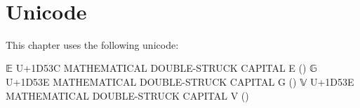 \begin{fence}
\begin{code}
\AgdaSymbol{=}\AgdaSpace{}%
%
\>[2135I]\AgdaSpace{}%
\AgdaSpace{}%
\AgdaSpace{}%
\AgdaSpace{}%
\AgdaSymbol{(}\AgdaSpace{}%
\AgdaSymbol{))}\AgdaSpace{}%
\AgdaOperator{\AgdaInductiveConstructor{,}}\<%
\\
\>[.][@{}l@{}]\<[2135I]%
\>[19]\AgdaSpace{}%
\AgdaSpace{}%
\AgdaSpace{}%
\AgdaSpace{}%
\AgdaSymbol{(}\AgdaSpace{}%
\AgdaSymbol{(}\AgdaSpace{}%
\AgdaSymbol{(}\AgdaSpace{}%
\AgdaSymbol{))))}\AgdaSpace{}%
\<%
\end{code}
\end{fence}

\hypertarget{unicode}{%
\section{Unicode}\label{unicode}}

This chapter uses the following unicode:

\begin{myDisplay}
𝔼  U+1D53C  MATHEMATICAL DOUBLE-STRUCK CAPITAL E (\bE)
𝔾  U+1D53E  MATHEMATICAL DOUBLE-STRUCK CAPITAL G (\bG)
𝕍  U+1D53E  MATHEMATICAL DOUBLE-STRUCK CAPITAL V (\bV)
\end{myDisplay}


